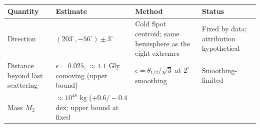 \documentclass[
  11pt,
]{article}
\begin{document}
\begin{longtable}[]{@{}llll@{}}
\toprule
\begin{minipage}[b]{0.22\columnwidth}\raggedright
Quantity\strut
\end{minipage} & \begin{minipage}[b]{0.22\columnwidth}\raggedright
Estimate\strut
\end{minipage} & \begin{minipage}[b]{0.22\columnwidth}\raggedright
Method\strut
\end{minipage} & \begin{minipage}[b]{0.22\columnwidth}\raggedright
Status\strut
\end{minipage}\tabularnewline
\midrule
\endhead
\begin{minipage}[t]{0.22\columnwidth}\raggedright
Direction\strut
\end{minipage} & \begin{minipage}[t]{0.22\columnwidth}\raggedright
\((203^\circ, -56^\circ) \pm 3^\circ\)\strut
\end{minipage} & \begin{minipage}[t]{0.22\columnwidth}\raggedright
Cold Spot centroid; same hemisphere as the eight extremes\strut
\end{minipage} & \begin{minipage}[t]{0.22\columnwidth}\raggedright
Fixed by data; attribution hypothetical\strut
\end{minipage}\tabularnewline
\begin{minipage}[t]{0.22\columnwidth}\raggedright
Distance beyond last scattering\strut
\end{minipage} & \begin{minipage}[t]{0.22\columnwidth}\raggedright
\(\epsilon = 0.025\), \(\approx 1.1\) Gly comoving (upper bound)\strut
\end{minipage} & \begin{minipage}[t]{0.22\columnwidth}\raggedright
\(\epsilon = \theta_{1/2}/\sqrt{3}\) at \(2^\circ\) smoothing\strut
\end{minipage} & \begin{minipage}[t]{0.22\columnwidth}\raggedright
Smoothing-limited\strut
\end{minipage}\tabularnewline
\begin{minipage}[t]{0.22\columnwidth}\raggedright
Mass \(M_2\)\strut
\end{minipage} & \begin{minipage}[t]{0.22\columnwidth}\raggedright
\(\approx 10^{48}\) kg (\(+0.6/-0.4\) dex; upper bound at fixed

\end{minipage}
\end{longtable}
\end{document}
